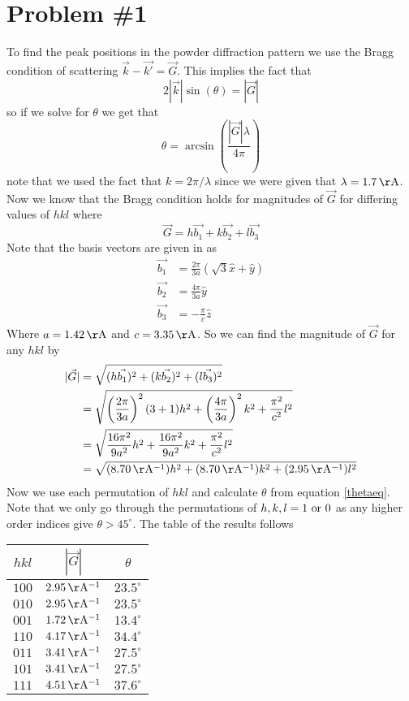 \documentclass[11pt]{article}
\numberwithin{equation}{section}
\begin{document}


\section{Problem \#1}
To find the peak positions in the powder diffraction pattern we use the Bragg condition of scattering $\vec{k}-\vec{k'} = \vec{G}$. This implies the fact that 
$$2|\vec{k}|\sin(\theta) = |\vec{G}|$$
so if we solve for $\theta$ we get that 
\begin{equation}
\theta = \arcsin\left(\frac{|\vec{G}|\lambda}{4\pi}\right)
\label{thetaeq}
\end{equation}
note that we used the fact that $k = 2\pi/\lambda$ since we were given that $\lambda = 1.7\unit{\AA}$. Now we know that the Bragg condition holds for magnitudes of $\vec{G}$ for differing values of $hkl$ where
$$\vec{G} = h\vec{b_1} + k\vec{b_2} + l\vec{b_3}$$
Note that the basis vectors are given in as
\begin{align*}
\vec{b_1} &= \frac{2\pi}{3a}\left(\sqrt{3}\hat{x}+\hat{y}\right)\\
\vec{b_2} &= \frac{4\pi}{3a}\hat{y}\\
\vec{b_3} &= -\frac{\pi}{c}\hat{z}
\end{align*}
Where $a = 1.42\unit{\AA}$ and $c = 3.35\unit{\AA}$. So we can find the magnitude of $\vec{G}$ for any $hkl$ by
\begin{align*}
|\vec{G}| &= \sqrt{(h\vec{b_1})^2 + (k\vec{b_2})^2 + (l\vec{b_3})^2}\\
&= \sqrt{\left(\frac{2\pi}{3a}\right)^2(3+1)h^2 + \left(\frac{4\pi}{3a}\right)^2k^2 + \frac{\pi^2}{c^2}l^2}\\
&= \sqrt{\frac{16\pi^2}{9a^2}h^2 + \frac{16\pi^2}{9a^2}k^2 + \frac{\pi^2}{c^2}l^2}\\
&= \sqrt{(8.70\unit{\AA^{-1}})h^2 + (8.70\unit{\AA^{-1}})k^2 + (2.95\unit{\AA^{-1}})l^2}
\end{align*}
Now we use each permutation of $hkl$ and calculate $\theta$ from equation \ref{thetaeq}. Note that we only go through the permutations of $h,k,l = 1 \textnormal{\ or\ } 0$ as any higher order indices give $\theta>45^{\circ}$. The table of the results follows 
\begin{center}
\begin{tabular}{c|c|c}
$hkl$		&$|\vec{G}|$		&$\theta$\\
\hline
$100$		&$2.95\unit{\AA^{-1}}$	&$23.5^{\circ}$\\
$010$		&$2.95\unit{\AA^{-1}}$	&$23.5^{\circ}$\\
$001$		&$1.72\unit{\AA^{-1}}$	&$13.4^{\circ}$\\
$110$		&$4.17\unit{\AA^{-1}}$	&$34.4^{\circ}$\\
$011$		&$3.41\unit{\AA^{-1}}$	&$27.5^{\circ}$\\
$101$		&$3.41\unit{\AA^{-1}}$	&$27.5^{\circ}$\\
$111$		&$4.51\unit{\AA^{-1}}$	&$37.6^{\circ}$
\end{tabular}
\end{center}
\end{document}
